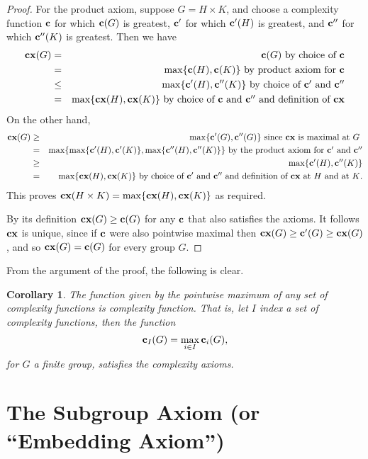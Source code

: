 \documentclass[a4paper,11pt]{amsart}
\newtheorem{corollary}[theorem]{Corollary}
\theoremstyle{definition}
\newcommand{\cx}{\mbox{\bf cx}}
\renewcommand{\c}{\mbox{\bf c}}
\newcommand{\1}{{\mathbf 1}}
\begin{document}
\begin{proof}
For the product axiom, suppose
$G=H\times K$, and
choose a complexity function $\c$ for which $\c(G)$ is greatest,  $\c'$ for which $\c'(H)$ is greatest, and $\c''$ for which $\c''(K)$ is greatest. Then we have
\begin{eqnarray*}
\cx(G)&= &\c(G) \mbox{ by choice of $\c$}\\
         &= &\max\{\c(H),\c(K)\} \mbox{ by product axiom for $\c$}\\
         &\leq&\max\{\c'(H),\c''(K)\} \mbox{ by choice of $\c'$ and $\c''$}\\
         & = &\max\{\cx(H),\cx(K)\} \mbox{ by choice of $\c$ and $\c''$ and definition of $\cx$}
         \end{eqnarray*}
         On the other hand,
 \begin{eqnarray*}   
 \cx(G) & \geq &\max\{\c'(G), \c''(G)\} \mbox{ since $\cx$ is maximal at $G$ }\\
         & =&\max\{\max\{\c'(H),\c'(K)\},
                  \max\{\c''(H),\c''(K)\}\} \mbox{ by the product axiom for $\c'$ and $\c''$}\\
         & \geq &\max\{\c'(H), \c''(K)\} \\
         & = & \max\{\cx(H),\cx(K)\} \mbox{ by choice of   $\c'$ and $\c''$ and definition of $\cx$ at $H$ and at $K$}.
       \end{eqnarray*}   
This proves $\cx(H\times K)=\max\{\cx(H),\cx(K)\}$ as required.

By its definition $\cx(G)\geq \c(G)$ for any $\c$ that also satisfies the axioms. It follows $\cx$ is unique, since if $\c$ were also pointwise maximal then $\cx(G)\geq \c'(G) \geq \cx(G)$, and so $\cx(G)=\c(G)$ for every group $G$.  
\end{proof}

From the argument of the proof, the following is clear.
\begin{corollary}
The function given by the pointwise maximum of any set of complexity functions is complexity function.  That is, 
let $I$ index a set of complexity functions, then the function $$\c_I(G)=\max_{i\in I} \c_i(G),$$
for  $G$ a finite group,   satisfies the complexity axioms. 
\end{corollary}


    
\section{The Subgroup Axiom (or ``Embedding Axiom'')}\label{SubgroupSec}
\end{document}

